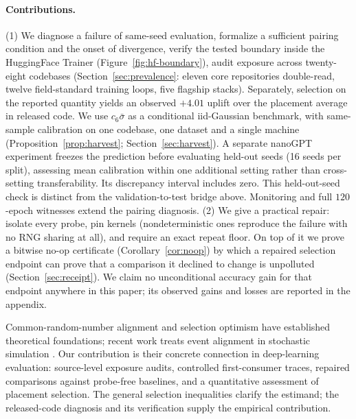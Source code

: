 \paragraph{Contributions.}
(1) We diagnose a failure of same-seed evaluation, formalize a sufficient
pairing condition and the onset of divergence,
verify the tested boundary inside the
HuggingFace Trainer (Figure~\ref{fig:hf-boundary}), audit exposure across
twenty-eight codebases (Section~\ref{sec:prevalence}: eleven core repositories
double-read, twelve field-standard training loops, five flagship
stacks). Separately, selection on the reported quantity yields an observed
$+4.01$ uplift over the placement average in released code. We use
$c_6\bar\sigma$ as a conditional iid-Gaussian benchmark, with same-sample
calibration on one codebase, one dataset and a single machine
(Proposition~\ref{prop:harvest}; Section~\ref{sec:harvest}). A separate nanoGPT
experiment freezes the prediction before evaluating held-out seeds (16 seeds
per split), assessing mean calibration within one additional setting rather
than cross-setting transferability. Its discrepancy interval includes zero.
This held-out-seed check is
distinct from the validation-to-test bridge above. Monitoring and full
$120$-epoch witnesses extend the pairing diagnosis.
(2) We give a practical repair: isolate every probe, pin kernels
(nondeterministic ones reproduce the failure with no RNG sharing at all), and
require an exact repeat floor. On top of it we prove a bitwise no-op
certificate (Corollary~\ref{cor:noop}) by which a repaired selection endpoint
can prove that a comparison it declined to change is unpolluted
(Section~\ref{sec:receipt}). We claim no unconditional accuracy gain for that
endpoint anywhere in this paper; its observed gains and losses are reported in
the appendix.
\contribdiagtwo{}

Common-random-number alignment and selection optimism have established
theoretical foundations; recent work treats event alignment in stochastic
simulation \citep{buffalo2026realizing}. Our contribution is their concrete
connection in deep-learning evaluation: source-level exposure audits,
controlled first-consumer traces, repaired comparisons against probe-free
baselines, and a quantitative assessment of placement selection. The general
selection inequalities clarify the estimand; the released-code diagnosis and
its verification supply the empirical contribution.

